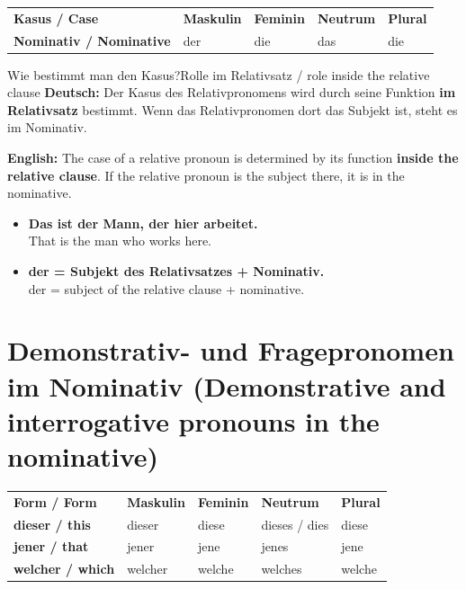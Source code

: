 \documentclass[a4paper,11pt]{article}
\newcommand{\GermanText}[1]{\textbf{Deutsch: }#1\par}
\newcommand{\EnglishText}[1]{{\small\color{SoftGray}\textbf{English: }#1\par}}
\newcommand{\ExampleItem}[2]{\item \textbf{#1}\\{\small\color{SoftGray}#2}}
\begin{document}
\begin{longtable}{>{\bfseries}p{4.0cm}|>{\centering\arraybackslash}p{2.8cm}>{\centering\arraybackslash}p{2.8cm}>{\centering\arraybackslash}p{2.8cm}>{\centering\arraybackslash}p{2.8cm}}
\rowcolor{HeaderBlueDark}
\color{white}\textbf{Kasus / Case} &
\color{white}\textbf{Maskulin} &
\color{white}\textbf{Feminin} &
\color{white}\textbf{Neutrum} &
\color{white}\textbf{Plural} \\
Nominativ / Nominative & der & die & das & die \\
\end{longtable}

\begin{grammarentry}{Wie bestimmt man den Kasus?}{Rolle im Relativsatz / role inside the relative clause}
\GermanText{Der Kasus des Relativpronomens wird durch seine Funktion \textbf{im Relativsatz} bestimmt. Wenn das Relativpronomen dort das Subjekt ist, steht es im Nominativ.}
\EnglishText{The case of a relative pronoun is determined by its function \textbf{inside the relative clause}. If the relative pronoun is the subject there, it is in the nominative.}
\end{grammarentry}

\begin{exbox}
\begin{itemize}
\ExampleItem{Das ist der Mann, der hier arbeitet.}{That is the man who works here.}
\ExampleItem{der = Subjekt des Relativsatzes + Nominativ.}{der = subject of the relative clause + nominative.}
\end{itemize}
\end{exbox}

\section{Demonstrativ- und Fragepronomen im Nominativ \textnormal{(Demonstrative and interrogative pronouns in the nominative)}}

\begin{longtable}{>{\bfseries}p{4.1cm}|>{\centering\arraybackslash}p{2.6cm}>{\centering\arraybackslash}p{2.6cm}>{\centering\arraybackslash}p{2.6cm}>{\centering\arraybackslash}p{2.6cm}}
\rowcolor{HeaderBlueDark}
\color{white}\textbf{Form / Form} &
\color{white}\textbf{Maskulin} &
\color{white}\textbf{Feminin} &
\color{white}\textbf{Neutrum} &
\color{white}\textbf{Plural} \\
dieser / this & dieser & diese & dieses / dies & diese \\
jener / that & jener & jene & jenes & jene \\
welcher / which & welcher & welche & welches & welche \\
\end{longtable}
\end{document}
